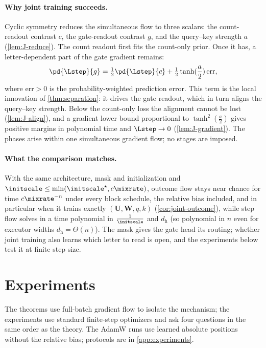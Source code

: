 \paragraph{Why joint training succeeds.} Cyclic symmetry reduces the simultaneous flow to three scalars: the count-readout contrast $c$,
the gate-readout contrast $g$, and the query--key strength $a$ (\cref{lem:J-reduce}). The count readout first fits the count-only prior.
Once it has, a letter-dependent part of the gate gradient remains:
\[
 \pd{\Lstep}{g}=\tfrac{1}{2}\pd{\Lstep}{c}+\tfrac{1}{2}\tanh(\frac{a}{2})\,\mathrm{err},
\]
where $\mathrm{err}>0$ is the probability-weighted prediction error. This term is the local innovation of \cref{thm:separation}: it drives
the gate readout, which in turn aligns the query--key strength. Below the count-only loss the alignment cannot be lost (\cref{lem:J-align}),
and a gradient lower bound proportional to $\tanh^2(\frac{a}{2})$ gives positive margins in polynomial time and $\Lstep\to0$
(\cref{lem:J-gradient}). The phases arise within one simultaneous gradient flow; no stages are imposed.

\paragraph{What the comparison matches.} With the same architecture, mask and initialization and $\initscale\le\min(\initscale^\star,c\mixrate)$,
outcome flow stays near chance for time $c\mixrate^{-n}$ under every block schedule, the relative bias included, and in particular when it
trains exactly $(\mathbf U,\mathbf W,q,k)$ (\cref{cor:joint-outcome}), while step flow solves in a time polynomial in $\frac{1}{\initscale}$ and $d_{\mathrm h}$ (so polynomial in $n$ even for executor widths $d_{\mathrm h}=\Theta(n)$). The mask gives
the gate head its routing; whether joint training also learns which letter to read is open, and the experiments below test it at
finite step size.

\suppressfloats[t]
\section{Experiments}
\label{sec:experiments}
\label{sec:validation}

The theorems use full-batch gradient flow to isolate the mechanism; the experiments use standard finite-step optimizers
and ask four questions in the same order as the theory. The AdamW runs use learned absolute positions without the relative bias;
protocols are in \cref{app:experiments}.


